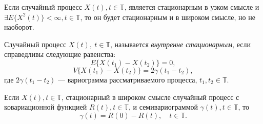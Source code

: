 \begin{Remark}
	Если случайный процесс $ X(t), t \in \mathbb{T} $, является стационарным в узком смысле и $ \exists E \{ X^2(t) \} < \infty, t \in \mathbb{T} $, то он будет стационарным и в широком смысле, но не наоборот.
\end{Remark}

\begin{Definition}
\label{eq:innerstat}
	Случайный процесс $ X(t),~ t \in \mathbb{T} $, называется \textit{внутренне стационарным}, если справедливы следующие равенства:
	\begin{equation}
	\label{eq:instat_expected}
		E \{ X(t_1) - X(t_2) \} = 0,
	\end{equation}
	\begin{equation}
	  V \{ X(t_1) - X(t_2) \} = 2 \gamma (t_1 - t_2),
	\end{equation}
	где $ 2 \gamma(t_1 - t_2) $ --- вариограмма рассматриваемого процесса, $ t_1, t_2 \in \mathbb{T} $.
\end{Definition}

\begin{Remark}
	Если $ X(t), t \in \mathbb{T} $, стационарный в широком смысле случайный процесс с ковариационной функцией $ R(t), t \in \mathbb{T} $, и семивариограммой $ \gamma(t), t \in \mathbb{T} $, то
	\begin{equation*}
		\gamma(t) = R(0) - R(t), \quad t \in \mathbb{T}.
	\end{equation*}
\end{Remark}

